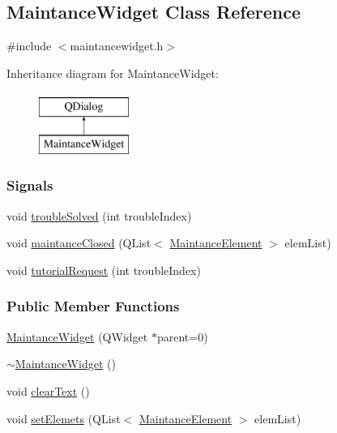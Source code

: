 \hypertarget{classMaintanceWidget}{}\subsection{Maintance\+Widget Class Reference}
\label{classMaintanceWidget}


{\ttfamily \#include $<$maintancewidget.\+h$>$}

Inheritance diagram for Maintance\+Widget\+:\begin{figure}[H]
\begin{center}
\leavevmode
\includegraphics[height=2.000000cm]{classMaintanceWidget}
\end{center}
\end{figure}
\subsubsection*{Signals}
\begin{DoxyCompactItemize}
\item 
void \mbox{\hyperlink{classMaintanceWidget_a311671167a33d7d84a105c5b68c3c783}{trouble\+Solved}} (int trouble\+Index)
\item 
void \mbox{\hyperlink{classMaintanceWidget_a016a9e2ad10ba518b29ac0bf336d8b97}{maintance\+Closed}} (Q\+List$<$ \mbox{\hyperlink{classMaintanceElement}{Maintance\+Element}} $>$ elem\+List)
\item 
void \mbox{\hyperlink{classMaintanceWidget_a94a81d4c917de6cc0dba1135ab3be43e}{tutorial\+Request}} (int trouble\+Index)
\end{DoxyCompactItemize}
\subsubsection*{Public Member Functions}
\begin{DoxyCompactItemize}
\item 
\mbox{\hyperlink{classMaintanceWidget_a8e8a76199a50d91c200eb1d7dcc66a14}{Maintance\+Widget}} (Q\+Widget $\ast$parent=0)
\item 
\mbox{\hyperlink{classMaintanceWidget_ad824060037187de4a61a24ce2e393ca0}{$\sim$\+Maintance\+Widget}} ()
\item 
void \mbox{\hyperlink{classMaintanceWidget_a46dbe90c80f405b594f2998a10a548db}{clear\+Text}} ()
\item 
void \mbox{\hyperlink{classMaintanceWidget_a32f98e1e9388b400f9b04e2fa94e8ef8}{set\+Elemets}} (Q\+List$<$ \mbox{\hyperlink{classMaintanceElement}{Maintance\+Element}} $>$ elem\+List)
\end{DoxyCompactItemize}
